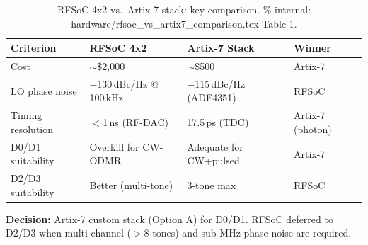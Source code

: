 \begin{table}[ht]
\centering
\caption{RFSoC 4x2 vs.\ Artix-7 stack: key comparison.
  \% internal: hardware/rfsoc\_vs\_artix7\_comparison.tex Table 1.}
\label{tab:rfsoc_vs_artix7}
\small
\begin{tabular}{@{}p{3.5cm}p{3.5cm}p{3.5cm}p{2cm}@{}}
\toprule
Criterion & RFSoC 4x2 & Artix-7 Stack & Winner \\
\midrule
Cost & $\sim$\$2,000 & $\sim$\$500 & Artix-7 \\
LO phase noise & $-$130\,dBc/Hz @ 100\,kHz & $-$115\,dBc/Hz (ADF4351) & RFSoC \\
Timing resolution & $<$1\,ns (RF-DAC) & 17.5\,ps (TDC)~\cite{Lim2025} & Artix-7 (photon) \\
D0/D1 suitability & Overkill for CW-ODMR & Adequate for CW+pulsed & Artix-7 \\
D2/D3 suitability & Better (multi-tone) & 3-tone max & RFSoC \\
\bottomrule
\end{tabular}
\end{table}

\noindent\textbf{Decision:} Artix-7 custom stack (Option A) for D0/D1. RFSoC deferred to D2/D3
when multi-channel ($>$8 tones) and sub-MHz phase noise are required.
